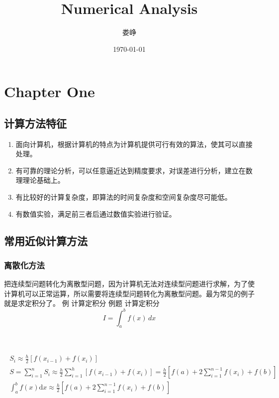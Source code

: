 \documentclass[12pt]{report}
\title{Numerical Analysis}
\author{娄峥}
\date{\today}
\numberwithin{equation}{section}
\begin{document}
	\maketitle
	\tableofcontents
	
	\clearpage

	\section{Chapter One}
	\subsection{计算方法特征}

	\begin{enumerate}
        \item 面向计算机，根据计算机的特点为计算机提供可行有效的算法，使其可以直接处理。
        \item 有可靠的理论分析，可以任意逼近达到精度要求，对误差进行分析，建立在数理理论基础上。
        \item 有比较好的计算复杂度，即算法的时间复杂度和空间复杂度尽可能低。
        \item 有数值实验，满足前三者后通过数值实验进行验证。
	\end{enumerate}
	
	\subsection{常用近似计算方法}
	\subsubsection{离散化方法}
	把连续型问题转化为离散型问题，因为计算机无法对连续型问题进行求解，为了使计算机可以正常运算，所以需要将连续型问题转化为离散型问题。最为常见的例子就是求定积分了。
例 计算定积分  
	例题 计算定积分
	$$I = \int_{a}^{b} f(x)\, dx$$   

	  \\

	\begin{equation}  
		\begin{aligned}  
			\begin{array}{c}  
				S_{i} \approx \frac{h}{2}\left[f\left(x_{i-1}\right)+f\left(x_{i}\right)\right] \\
				S=\sum_{i=1}^{n} S_{i} \approx \frac{h}{2} \sum_{i=1}^{h}\left[f\left(x_{i-1}\right)+f\left(x_{i}\right)\right]=\frac{h}{2}\left[f(a)+2 \sum_{i=1}^{n-1} f\left(x_{i}\right)+f(b)\right] \\
				\int_{a}^{b} f(x) \mathrm{d} x \approx \frac{h}{2}\left[f(a)+2 \sum_{i=1}^{n-1} f\left(x_{i}\right)+f(b)\right]
			\end{array}  
		\end{aligned}  
	\end{equation}
\end{document}
